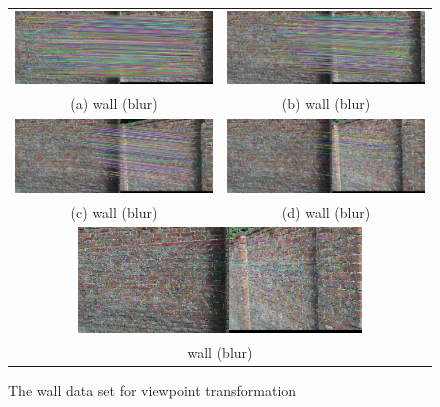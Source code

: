 \begin{figure}[H]
\begin{tabular}{cc}
  \includegraphics[width=75mm]{figures/wall_final_1_2} &  \includegraphics[width=75mm]{figures/wall_final_1_3} \\
(a) wall (blur) & (b) wall (blur) \\[6pt]
  \includegraphics[width=75mm]{figures/wall_final_1_4} &  \includegraphics[width=75mm]{figures/wall_final_1_5} \\
(c) wall (blur) & (d) wall (blur) \\[6pt]
  \multicolumn{2}{c}{\includegraphics[width=75mm]{figures/wall_final_1_6}} \\
  \multicolumn{2}{c}{wall (blur)} \\[6pt]
\end{tabular}
\caption{The wall data set for viewpoint transformation}\label{fig:epipolar_matching_wall}
\end{figure}

